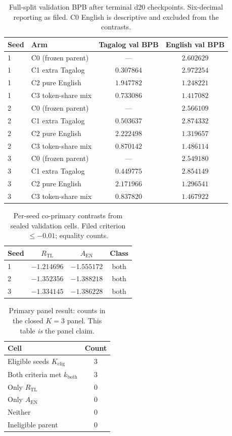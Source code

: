 \documentclass[11pt,a4paper]{article}
\begin{document}
\begin{table}[ht]
\centering
\caption{Full-split validation BPB after terminal d20 checkpoints. Six-decimal reporting as filed. C0 English is descriptive and excluded from the contrasts.}
\label{tab:cells}
\begin{tabular}{llcc}
\toprule
Seed & Arm & Tagalog val BPB & English val BPB \\
\midrule
1 & C0 (frozen parent) & --- & $2.602629$ \\
1 & C1 extra Tagalog & $0.307864$ & $2.972254$ \\
1 & C2 pure English & $1.947782$ & $1.248221$ \\
1 & C3 token-share mix & $0.733086$ & $1.417082$ \\
\midrule
2 & C0 (frozen parent) & --- & $2.566109$ \\
2 & C1 extra Tagalog & $0.503637$ & $2.874332$ \\
2 & C2 pure English & $2.222498$ & $1.319657$ \\
2 & C3 token-share mix & $0.870142$ & $1.486114$ \\
\midrule
3 & C0 (frozen parent) & --- & $2.549180$ \\
3 & C1 extra Tagalog & $0.449775$ & $2.854149$ \\
3 & C2 pure English & $2.171966$ & $1.296541$ \\
3 & C3 token-share mix & $0.837820$ & $1.467922$ \\
\bottomrule
\end{tabular}
\end{table}

\begin{table}[ht]
\centering
\caption{Per-seed co-primary contrasts from sealed validation cells. Filed criterion $\le -0.01$; equality counts.}
\label{tab:contrasts}
\begin{tabular}{lccc}
\toprule
Seed & $R_{\mathrm{TL}}$ & $A_{\mathrm{EN}}$ & Class \\
\midrule
1 & $-1.214696$ & $-1.555172$ & both \\
2 & $-1.352356$ & $-1.388218$ & both \\
3 & $-1.334145$ & $-1.386228$ & both \\
\bottomrule
\end{tabular}
\end{table}

\begin{table}[ht]
\centering
\caption{Primary panel result: counts in the closed $K=3$ panel. This table \emph{is} the panel claim.}
\label{tab:panel}
\begin{tabular}{lc}
\toprule
Cell & Count \\
\midrule
Eligible seeds $K_{\mathrm{elig}}$ & $3$ \\
Both criteria met $k_{\mathrm{both}}$ & $3$ \\
Only $R_{\mathrm{TL}}$ & $0$ \\
Only $A_{\mathrm{EN}}$ & $0$ \\
Neither & $0$ \\
Ineligible parent & $0$ \\
\bottomrule
\end{tabular}
\end{table}
\end{document}
